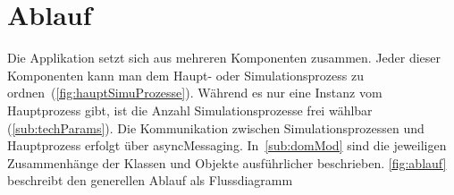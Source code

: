   \section{Ablauf\label{sec:Ablauf}}

    Die Applikation setzt sich aus mehreren Komponenten zusammen.
    Jeder dieser Komponenten kann man dem Haupt- oder Simulationsprozess zu ordnen~(\vref{fig:hauptSimuProzesse}).
    Während es nur eine Instanz vom Hauptprozess gibt,
    ist die Anzahl Simulationsprozesse frei wählbar (\vref{sub:techParams}).
    Die Kommunikation zwischen Simulationsprozessen und Hauptprozess erfolgt über \gls{asyncMessaging}.
    In~\vref{sub:domMod} sind die jeweiligen Zusammenhänge der Klassen und Objekte ausführlicher beschrieben.
    \vref{fig:ablauf} beschreibt den generellen Ablauf als Flussdiagramm

